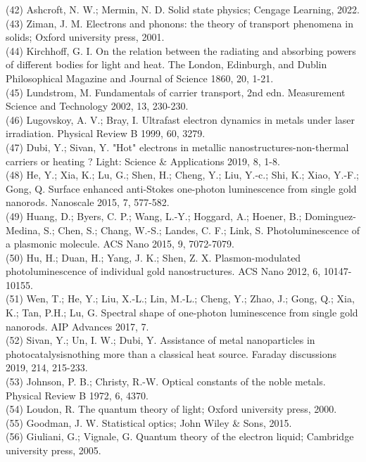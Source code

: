 \documentclass[10pt]{article}
\begin{document}
(42) Ashcroft, N. W.; Mermin, N. D. Solid state physics; Cengage Learning, 2022.\\
(43) Ziman, J. M. Electrons and phonons: the theory of transport phenomena in solids; Oxford university press, 2001.\\
(44) Kirchhoff, G. I. On the relation between the radiating and absorbing powers of different bodies for light and heat. The London, Edinburgh, and Dublin Philosophical Magazine and Journal of Science 1860, 20, 1-21.\\
(45) Lundstrom, M. Fundamentals of carrier transport, 2nd edn. Measurement Science and Technology 2002, 13, 230-230.\\
(46) Lugovskoy, A. V.; Bray, I. Ultrafast electron dynamics in metals under laser irradiation. Physical Review B 1999, 60, 3279.\\
(47) Dubi, Y.; Sivan, Y. "Hot" electrons in metallic nanostructures-non-thermal carriers or heating ? Light: Science \& Applications 2019, 8, 1-8.\\
(48) He, Y.; Xia, K.; Lu, G.; Shen, H.; Cheng, Y.; Liu, Y.-c.; Shi, K.; Xiao, Y.-F.; Gong, Q. Surface enhanced anti-Stokes one-photon luminescence from single gold nanorods. Nanoscale 2015, 7, 577-582.\\
(49) Huang, D.; Byers, C. P.; Wang, L.-Y.; Hoggard, A.; Hoener, B.; Dominguez-Medina, S.; Chen, S.; Chang, W.-S.; Landes, C. F.; Link, S. Photoluminescence of a plasmonic molecule. ACS Nano 2015, 9, 7072-7079.\\
(50) Hu, H.; Duan, H.; Yang, J. K.; Shen, Z. X. Plasmon-modulated photoluminescence of individual gold nanostructures. ACS Nano 2012, 6, 10147-10155.\\
(51) Wen, T.; He, Y.; Liu, X.-L.; Lin, M.-L.; Cheng, Y.; Zhao, J.; Gong, Q.; Xia, K.; Tan, P.H.; Lu, G. Spectral shape of one-photon luminescence from single gold nanorods. AIP Advances 2017, 7.\\
(52) Sivan, Y.; Un, I. W.; Dubi, Y. Assistance of metal nanoparticles in photocatalysisnothing more than a classical heat source. Faraday discussions 2019, 214, 215-233.\\
(53) Johnson, P. B.; Christy, R.-W. Optical constants of the noble metals. Physical Review B 1972, 6, 4370.\\
(54) Loudon, R. The quantum theory of light; Oxford university press, 2000.\\
(55) Goodman, J. W. Statistical optics; John Wiley \& Sons, 2015.\\
(56) Giuliani, G.; Vignale, G. Quantum theory of the electron liquid; Cambridge university press, 2005.\\
\end{document}
